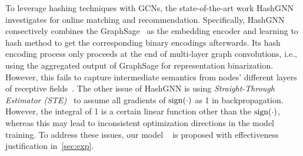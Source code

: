 To leverage hashing techniques with GCNs, the state-of-the-art work HashGNN~\cite{hashgnn} investigates  for online matching and recommendation.
Specifically, HashGNN consectively combines the GraphSage~\cite{graphsage} as the embedding encoder and learning to hash method to get the corresponding binary encodings afterwards.
Its hash encoding process only proceeds at the end of multi-layer graph convolutions, i.e., using the aggregated output of GraphSage for representation binarization. 
However, this fails to capture intermediate semantics from nodes' different layers of receptive fields~\cite{kipf2016semi}.
The other issue of HashGNN is using \textit{Straight-Through Estimator (STE)}~\cite{bengio2013estimating} to assume all gradients of $\operatorname{sign}(\cdot)$ as 1 in backpropagation.
However, the integral of 1 is a certain linear function other than the $\operatorname{sign}(\cdot)$, whereas this may lead to inconsistent optimization directions in the model training.
To address these issues, our model \model~ is proposed with effectiveness justification in~\cref{sec:exp}.


